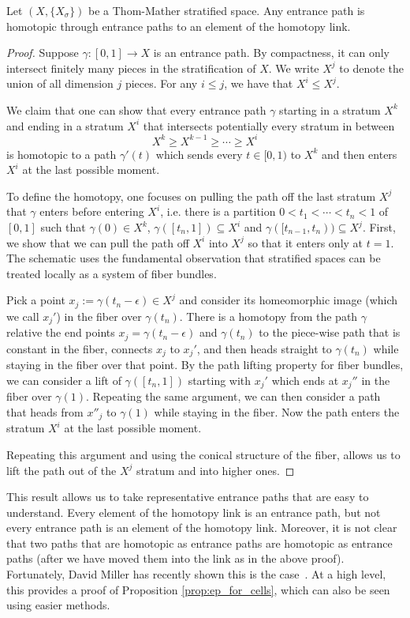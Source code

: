 \begin{lem}
	Let $(X,\{X_{\sigma}\})$ be a Thom-Mather stratified space. Any entrance path is homotopic through entrance paths to an element of the homotopy link.
\end{lem}
\begin{proof}
	Suppose $\gamma:[0,1]\to X$ is an entrance path. By compactness, it can only intersect finitely many pieces in the stratification of $X$. We write $X^j$ to denote the union of all dimension $j$ pieces. For any $i\leq j$, we have that $X^i\leq X^j$. 
	
	We claim that one can show that every entrance path $\gamma$ starting in a stratum $X^k$ and ending in a stratum $X^i$ that intersects potentially every stratum in between
	\[
		X^k\geq X^{k-1} \geq \cdots \geq X^i
	\]
	is homotopic to a path $\gamma'(t)$ which sends every $t\in [0,1)$ to $X^k$ and then enters $X^i$ at the last possible moment.
	
	To define the homotopy, one focuses on pulling the path off the last stratum $X^j$ that $\gamma$ enters before entering $X^i$, i.e. there is a partition $0<t_1<\cdots < t_n< 1$ of $[0,1]$ such that $\gamma(0)\in X^k$, $\gamma([t_n,1])\subseteq X^i$ and $\gamma([t_{n-1},t_n))\subseteq X^j$. First, we show that we can pull the path off $X^i$ into $X^j$ so that it enters only at $t=1$. The schematic uses the fundamental observation that stratified spaces can be treated locally as a system of fiber bundles.

Pick a point $x_j:=\gamma(t_n-\epsilon)\in X^j$ and consider its homeomorphic image (which we call $x_j'$) in the fiber over $\gamma(t_n)$. There is a homotopy from the path $\gamma$ relative the end points $x_j=\gamma(t_n-\epsilon)$ and $\gamma(t_n)$ to the piece-wise path that is constant in the fiber, connects $x_j$ to $x_j'$, and then heads straight to $\gamma(t_n)$ while staying in the fiber over that point. By the path lifting property for fiber bundles, we can consider a lift of $\gamma([t_n,1])$ starting with $x_j'$ which ends at $x_j''$ in the fiber over $\gamma(1)$. Repeating the same argument, we can then consider a path that heads from $x''_j$ to $\gamma(1)$ while staying in the fiber. Now the path enters the stratum $X^i$ at the last possible moment.

Repeating this argument and using the conical structure of the fiber, allows us to lift the path out of the $X^j$ stratum and into higher ones. 
\end{proof}

This result allows us to take representative entrance paths that are easy to understand. Every element of the homotopy link is an entrance path, but not every entrance path is an element of the homotopy link. Moreover, it is not clear that two paths that are homotopic as entrance paths are homotopic as entrance paths (after we have moved them into the link as in the above proof). Fortunately, David Miller has recently shown this is the case~\cite{miller-popaths}. At a high level, this provides a proof of Proposition \ref{prop:ep_for_cells}, which can also be seen using easier methods.

